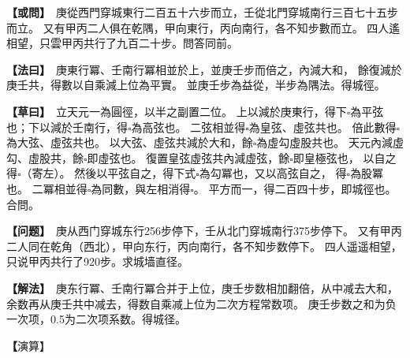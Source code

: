 \documentclass[11pt,a4paper]{article}
\let\origsquare\square
\renewcommand{\square}{\ensuremath{\origsquare}}%
\newcommand{\clOWEN}[1]{%
  \par\vspace{0.3em}%
  \noindent\textcolor{problemcolor}{\textbf{【或問】}}\,{\tradfont #1}\par\nopagebreak%
}
\newcommand{\mdOWEN}[1]{%
  \par\vspace{0.3em}%
  \noindent\textcolor{problemcolor}{\textbf{【问题】}}\,{\modfont #1}\par\nopagebreak%
}
\newcommand{\clFAYUE}[1]{%
  \par\noindent\textcolor{methodcolor}{\textbf{【法曰】}}\,{\tradfont #1}\par\nopagebreak%
}
\newcommand{\mdFAYUE}[1]{%
  \par\noindent\textcolor{methodcolor}{\textbf{【解法】}}\,{\modfont #1}\par\nopagebreak%
}
\newcommand{\clTSAOYUE}[1]{%
  \par\noindent\textcolor{workcolor}{\textbf{【草曰】}}\,{\tradfont #1}\par%
}
\newcommand{\mdTSAOYUE}[1]{%
  \par\noindent\textcolor{workcolor}{\textbf【演算】}}\,{\modfont #1}\par%
\begin{document}
\vspace{0.3cm}

\begin{paracol}{2}

\begin{leftcolumn}
\clOWEN{%
庚從西門穿城東行二百五十六步而立，壬從北門穿城南行三百七十五步而立。
又有甲丙二人俱在乾隅，甲向東行，丙向南行，各不知步數而立。
四人遙相望，只雲甲丙共行了九百二十步。問答同前。}

\clFAYUE{%
庚東行冪、壬南行冪相並於上，並庚壬步而倍之，內減大和，
餘復減於庚壬共，得數以自乘減上位為平實。
並庚壬步為益從，半步為隅法。得城徑。}

\clTSAOYUE{%
立天元一為圓徑，以半之副置二位。
上以減於庚東行，得下$\square$為平弦也；下以減於壬南行，得$\square$為高弦也。
二弦相並得$\square$為皇弦、虛弦共也。
倍此數得$\square$為大弦、虛弦共也。
以大弦、虛弦共減於大和，餘$\square$為虛勾虛股共也。
天元內減虛勾、虛股共，餘$\square$即虛弦也。
復置皇弦虛弦共內減虛弦，餘$\square$即皇極弦也，
以自之得$\square$（寄左）。
然後以平弦自之，得下式$\square$為勾冪也，又以高弦自之，
得$\square$為股冪也。
二冪相並得$\square$為同數，與左相消得$\square$。
平方而一，得二百四十步，即城徑也。合問。}
\end{leftcolumn}

\switchcolumn

\begin{rightcolumn}
\mdOWEN{%
庚从西门穿城东行256步停下，壬从北门穿城南行375步停下。
又有甲丙二人同在乾角（西北），甲向东行，丙向南行，各不知步数停下。
四人遥遥相望，只说甲丙共行了920步。求城墙直径。}

\mdFAYUE{%
庚东行冪、壬南行冪合并于上位，庚壬步数相加翻倍，从中减去大和，
余数再从庚壬共中减去，得数自乘减上位为二次方程常数项。
庚壬步数之和为负一次项，0.5为二次项系数。得城径。}

\mdTSAOYUE{%
设天元一为圆径，取半后分置两位。
上位从庚东行中减去得下式$\square$为平弦；下位从壬南行中减去得$\square$为高弦。
两弦相加得$\square$为皇弦与虚弦之和。
此数翻倍得$\square$为大弦与虚弦之和。
以大弦、虚弦之和减于大和余$\square$为虚勾与虚股之和。
天元内减虚勾、虚股之和余$\square$即虚弦。
再取皇弦虚弦之和减去虚弦余$\square$即皇极弦，
自乘得$\square$（寄左）。
然后平弦自乘得下式$\square$为勾冪，高弦自乘
得$\square$为股冪。
两冪合并得$\square$为同数，与左式相消得$\square$。
开平方得240步，即城径。符合所问。}
\end{rightcolumn}

\end{paracol}
\end{document}

